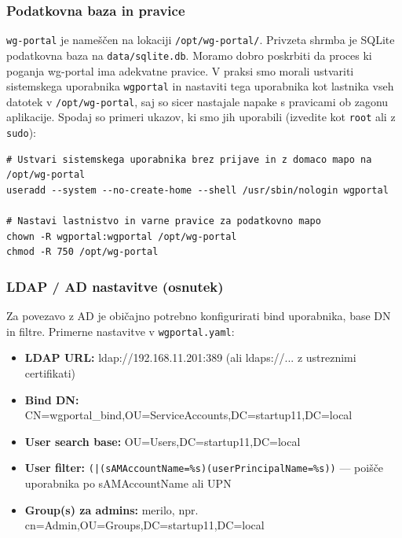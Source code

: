 \documentclass[a4paper,11pt]{article}
\begin{document}
\subsubsection{Podatkovna baza in pravice}
\texttt{wg-portal} je nameščen na lokaciji \texttt{/opt/wg-portal/}. Privzeta shrmba je SQLite podatkovna baza na \texttt{data/sqlite.db}. 
Moramo dobro poskrbiti da proces ki poganja wg-portal ima adekvatne pravice. V praksi smo morali ustvariti sistemskega uporabnika \texttt{wgportal} 
in nastaviti tega uporabnika kot lastnika vseh datotek v \texttt{/opt/wg-portal}, saj so sicer nastajale napake s pravicami ob zagonu aplikacije. 
Spodaj so primeri ukazov, ki smo jih uporabili (izvedite kot \texttt{root} ali z \texttt{sudo}):
\begin{lstlisting}
# Ustvari sistemskega uporabnika brez prijave in z domaco mapo na /opt/wg-portal
useradd --system --no-create-home --shell /usr/sbin/nologin wgportal

# Nastavi lastnistvo in varne pravice za podatkovno mapo
chown -R wgportal:wgportal /opt/wg-portal
chmod -R 750 /opt/wg-portal
\end{lstlisting}

\subsubsection{LDAP / AD nastavitve (osnutek)}
Za povezavo z AD je običajno potrebno konfigurirati bind uporabnika, base DN in filtre. Primerne nastavitve v \texttt{wgportal.yaml}:
\begin{itemize}
  \item \textbf{LDAP URL:} ldap://192.168.11.201:389 (ali ldaps://... z ustreznimi certifikati)
  \item \textbf{Bind DN:} CN=wgportal\_bind,OU=ServiceAccounts,DC=startup11,DC=local
  \item \textbf{User search base:} OU=Users,DC=startup11,DC=local
  \item \textbf{User filter:} \texttt{(|(sAMAccountName=\%s)(userPrincipalName=\%s))} --- poišče uporabnika po sAMAccountName ali UPN
  \item \textbf{Group(s) za admins:} merilo, npr. cn=Admin,OU=Groups,DC=startup11,DC=local
\end{itemize}
\end{document}
